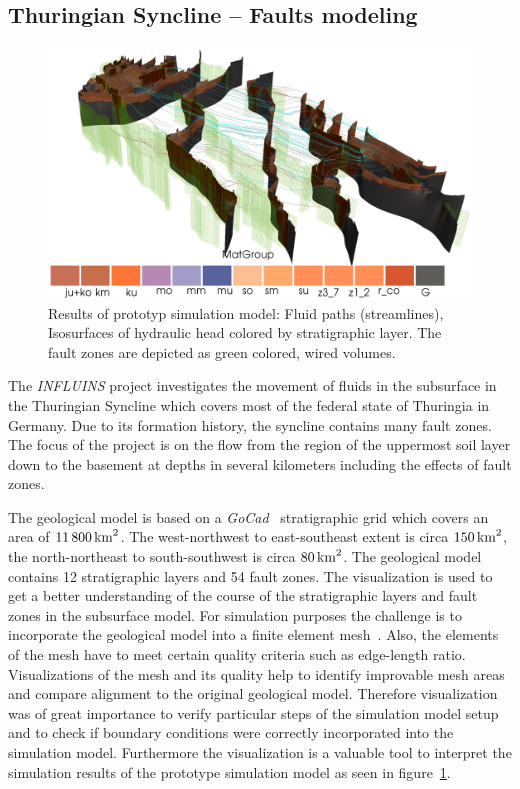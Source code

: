 \documentclass[twocolumn]{svjour3}          %
\begin{document}
\subsection{Thuringian Syncline -- Faults modeling}
\label{thuringian-syncline---faults}

\begin{figure}[htb]
  \includegraphics[width=\linewidth]{images/ThuringianSyncline.png}
\caption{Results of prototyp simulation model: Fluid paths (streamlines),
Isosurfaces of hydraulic head colored by stratigraphic layer. The fault zones
are depicted as green colored, wired volumes.}
\label{fig:ThuringianSyncline}
\end{figure}

The \emph{INFLUINS} project investigates the movement of fluids in the subsurface in the Thuringian Syncline which covers most of the federal state of Thuringia in Germany. Due to its formation history, the syncline contains many fault zones. The focus of the project is on the flow from the region of the uppermost soil layer down to the basement at depths in several kilometers including the effects of fault zones.

The geological model is based on a \emph{GoCad}~\cite{web:gocad} stratigraphic grid which covers an area of $11\,800\,\textnormal{km}^2$. The west-northwest to east-southeast extent is circa $150\,\textnormal{km}^2$, the north-northeast to south-southwest is circa $80\,\textnormal{km}^2$. The geological model contains 12 stratigraphic layers and 54 fault zones. The visualization is used to get a better understanding of the course of the stratigraphic layers and fault zones in the subsurface model. For simulation purposes the challenge is to incorporate the geological model into a finite element mesh~\cite{zehner:gocad}. Also, the elements of the mesh have to meet certain quality criteria such as edge-length ratio. Visualizations of the mesh and its quality help to identify improvable mesh areas and compare alignment to the original geological model. Therefore visualization was of great importance to verify particular steps of the simulation model setup and to check if boundary conditions were correctly incorporated into the simulation model. Furthermore the visualization is a valuable tool to interpret the simulation results of the prototype simulation model as seen in figure~\ref{fig:ThuringianSyncline}.
\end{document}
